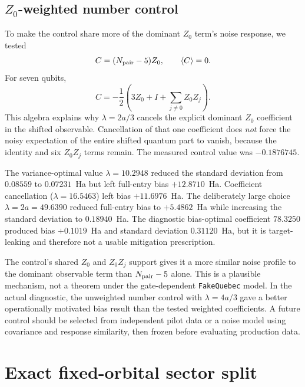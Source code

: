 \documentclass[11pt]{article}
\newcommand{\code}[1]{\texttt{#1}}
\begin{document}
\subsection{\texorpdfstring{$Z_0$}{Z0}-weighted number control}

To make the control share more of the dominant $Z_0$ term's noise response,
we tested
\[
  C=(N_{\rm pair}-5)Z_0,
  \qquad \langle C\rangle=0.
\]
For seven qubits,
\[
 C=-\frac12\left(3Z_0+I+\sum_{j\ne0}Z_0Z_j\right).
\]
This algebra explains why $\lambda=2a/3$ cancels the explicit dominant
$Z_0$ coefficient in the shifted observable.  Cancellation of that one
coefficient does \emph{not} force the noisy expectation of the entire shifted
quantum part to vanish, because the identity and six $Z_0Z_j$ terms remain.
The measured control value was $-0.1876745$.

The variance-optimal value $\lambda=10.2948$ reduced the standard deviation
from $0.08559$ to $0.07231$~Ha but left full-entry bias $+12.8710$~Ha.
Coefficient cancellation ($\lambda=16.5463$) left bias $+11.6976$~Ha.
The deliberately large choice $\lambda=2a=49.6390$ reduced full-entry bias to
$+5.4862$~Ha while increasing the standard deviation to $0.18940$~Ha.  The
diagnostic bias-optimal coefficient $78.3250$ produced bias $+0.1019$~Ha and
standard deviation $0.31120$~Ha, but it is target-leaking and therefore not a
usable mitigation prescription.

The control's shared $Z_0$ and $Z_0Z_j$ support gives it a more similar noise
profile to the dominant observable term than $N_{\rm pair}-5$ alone.  This is
a plausible mechanism, not a theorem under the gate-dependent
\code{FakeQuebec} model.  In the actual diagnostic, the unweighted number
control with $\lambda=4a/3$ gave a better operationally motivated bias result
than the tested weighted coefficients.  A future control should be selected
from independent pilot data or a noise model using covariance and response
similarity, then frozen before evaluating production data.

\section{Exact fixed-orbital sector split}
\end{document}
